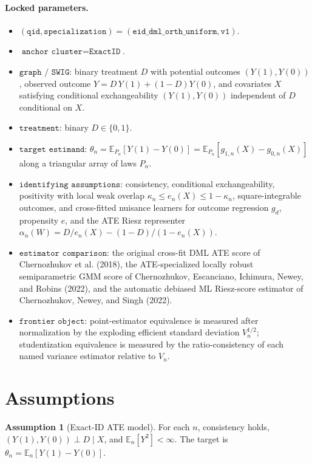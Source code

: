 \documentclass[11pt]{article}
\newcommand{\E}{\mathbb{E}}
\theoremstyle{definition}
\newtheorem{assumption}{Assumption}
\theoremstyle{plain}
\theoremstyle{remark}
\begin{document}
\paragraph{Locked parameters.}
\begin{itemize}
  \item \((\texttt{qid},\texttt{specialization})=(\texttt{eid\_dml\_orth\_uniform},\texttt{v1})\).
  \item \(\texttt{anchor cluster}=\texttt{ExactID}\).
  \item \(\texttt{graph / SWIG}\): binary treatment \(D\) with potential outcomes \((Y(1),Y(0))\), observed outcome \(Y=D\,Y(1)+(1-D)Y(0)\), and covariates \(X\) satisfying conditional exchangeability \((Y(1),Y(0))\) independent of \(D\) conditional on \(X\).
  \item \(\texttt{treatment}\): binary \(D\in\{0,1\}\).
  \item \(\texttt{target estimand}\): \(\theta_n=\E_{P_n}[Y(1)-Y(0)]=\E_{P_n}[g_{1,n}(X)-g_{0,n}(X)]\) along a triangular array of laws \(P_n\).
  \item \(\texttt{identifying assumptions}\): consistency, conditional exchangeability, positivity with local weak overlap \(\kappa_n\le e_n(X)\le1-\kappa_n\), square-integrable outcomes, and cross-fitted nuisance learners for outcome regression \(g_d\), propensity \(e\), and the ATE Riesz representer \(\alpha_n(W)=D/e_n(X)-(1-D)/(1-e_n(X))\).
  \item \(\texttt{estimator comparison}\): the original cross-fit DML ATE score of Chernozhukov et al. (2018), the ATE-specialized locally robust semiparametric GMM score of Chernozhukov, Escanciano, Ichimura, Newey, and Robins (2022), and the automatic debiased ML Riesz-score estimator of Chernozhukov, Newey, and Singh (2022).
  \item \(\texttt{frontier object}\): point-estimator equivalence is measured after normalization by the exploding efficient standard deviation \(V_n^{1/2}\); studentization equivalence is measured by the ratio-consistency of each named variance estimator relative to \(V_n\).
\end{itemize}

\section{Assumptions}
\begin{assumption}[Exact-ID ATE model]\label{ass:exact-ate}
For each \(n\), consistency holds, \((Y(1),Y(0))\perp D\mid X\), and \(\E_n[Y^2]<\infty\).  The target is \(\theta_n=\E_n[Y(1)-Y(0)]\).
\end{assumption}
\end{document}

